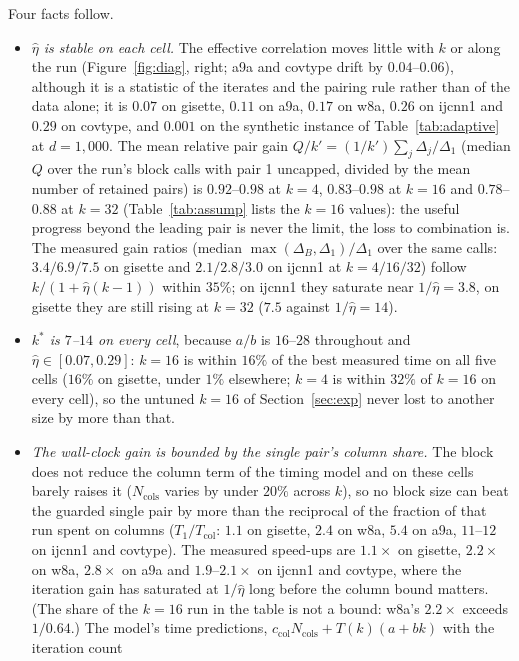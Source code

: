 Four facts follow.
\begin{itemize}\setlength\itemsep{0pt}
\item \emph{$\hat\eta$ is stable on each cell.} The effective
correlation moves little with $k$ or along the run (Figure~\ref{fig:diag},
right; a9a and covtype drift by $0.04$--$0.06$), although it is a statistic of the
iterates and the pairing rule rather than of the data alone; it is $0.07$ on
gisette, $0.11$ on a9a, $0.17$ on w8a, $0.26$ on ijcnn1 and $0.29$ on
covtype, and $0.001$ on the synthetic instance of
Table~\ref{tab:adaptive} at $d{=}1{,}000$. The mean relative pair gain
$Q/k'=(1/k')\sum_j\Delta_j/\Delta_1$ (median $Q$ over the run's block
calls with pair 1 uncapped, divided by the mean number of retained
pairs) is $0.92$--$0.98$ at $k=4$, $0.83$--$0.98$ at $k=16$ and
$0.78$--$0.88$ at $k=32$ (Table~\ref{tab:assump} lists the $k=16$
values): the useful progress beyond the leading pair is never the
limit, the loss to combination is. The measured gain ratios (median
$\max(\Delta_B,\Delta_1)/\Delta_1$ over the same calls: $3.4/6.9/7.5$ on
gisette and $2.1/2.8/3.0$ on ijcnn1 at $k=4/16/32$) follow
$k/(1+\hat\eta(k-1))$ within $35\%$; on ijcnn1 they saturate near
$1/\hat\eta=3.8$, on gisette they are still rising at $k=32$ ($7.5$
against $1/\hat\eta=14$).
\item \emph{$k^*$ is $7$--$14$ on every cell}, because $a/b$ is
$16$--$28$ throughout and $\hat\eta\in[0.07,0.29]$: $k{=}16$ is within
$16\%$ of the best measured time on all five cells ($16\%$ on gisette,
under $1\%$ elsewhere; $k{=}4$ is within $32\%$ of $k{=}16$ on every
cell), so the
untuned $k=16$ of Section~\ref{sec:exp} never lost to another size by
more than that.
\item \emph{The wall-clock gain is bounded by the single pair's column
share.} The block does not reduce the column term of the timing model and on
these cells barely raises it ($N_{\mathrm{cols}}$ varies by under $20\%$
across $k$),
so no block size can beat the guarded single pair by more than the
reciprocal of the fraction of that run spent on columns ($T_1/T_{\mathrm{col}}$:
$1.1$ on gisette, $2.4$ on w8a, $5.4$ on a9a, $11$--$12$ on ijcnn1 and
covtype). The measured speed-ups are $1.1\times$ on gisette,
$2.2\times$ on w8a, $2.8\times$ on a9a and $1.9$--$2.1\times$ on ijcnn1
and covtype, where the iteration gain has saturated at $1/\hat\eta$
long before the column bound matters. (The share of the $k{=}16$ run
in the table is not a bound: w8a's $2.2\times$ exceeds $1/0.64$.) The model's time predictions,
$c_{\mathrm{col}}N_{\mathrm{cols}}+T(k)(a+bk)$ with the iteration count

\end{itemize}
